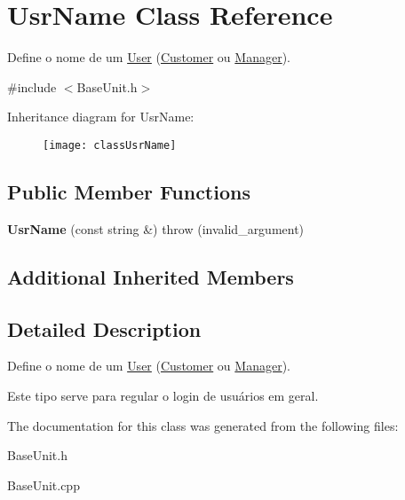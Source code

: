 \hypertarget{classUsrName}{\section{Usr\-Name Class Reference}
\label{classUsrName}
}


Define o nome de um \hyperlink{classUser}{User} (\hyperlink{classCustomer}{Customer} ou \hyperlink{classManager}{Manager}).  




{\ttfamily \#include $<$Base\-Unit.\-h$>$}

Inheritance diagram for Usr\-Name\-:\begin{figure}[H]
\begin{center}
\leavevmode
\texttt{[image: classUsrName]}
\end{center}
\end{figure}
\subsection*{Public Member Functions}
\begin{DoxyCompactItemize}
\item 
\hypertarget{classUsrName_a3028672b21248ef880a01e3621e02827}{{\bfseries Usr\-Name} (const string \&)  throw (invalid\-\_\-argument)}\label{classUsrName_a3028672b21248ef880a01e3621e02827}

\end{DoxyCompactItemize}
\subsection*{Additional Inherited Members}


\subsection{Detailed Description}
Define o nome de um \hyperlink{classUser}{User} (\hyperlink{classCustomer}{Customer} ou \hyperlink{classManager}{Manager}). 

Este tipo serve para regular o login de usuários em geral. 

The documentation for this class was generated from the following files\-:\begin{DoxyCompactItemize}
\item 
Base\-Unit.\-h\item 
Base\-Unit.\-cpp\end{DoxyCompactItemize}

